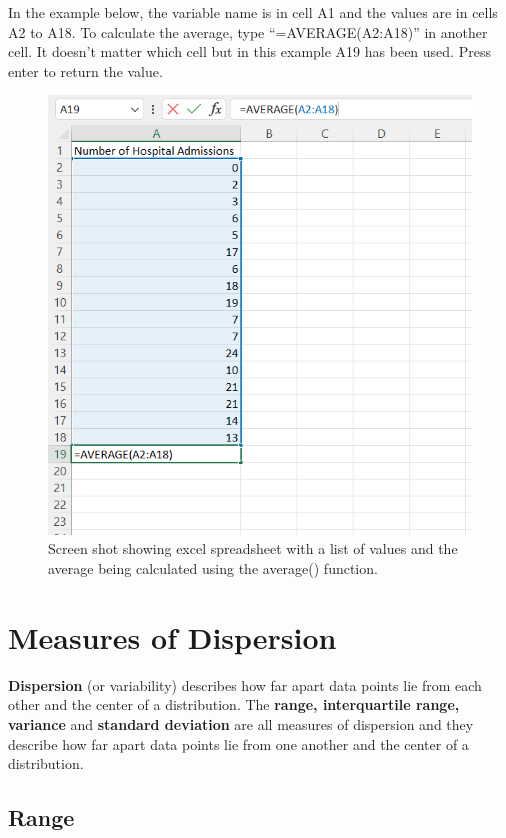 \documentclass[
]{book}
\begin{document}
In the example below, the variable name is in cell A1 and the values are in cells A2 to A18. To calculate the average, type ``=AVERAGE(A2:A18)'' in another cell. It doesn't matter which cell but in this example A19 has been used. Press enter to return the value.

\begin{figure}
\centering
\includegraphics{Excelimage.png}
\caption{Screen shot showing excel spreadsheet with a list of values and the average being calculated using the average() function.}
\end{figure}

\hypertarget{measures-of-dispersion}{%
\section{Measures of Dispersion}\label{measures-of-dispersion}}

\textbf{Dispersion} (or variability) describes how far apart data points lie from each other and the center of a distribution. The \textbf{range, interquartile range, variance} and \textbf{standard deviation} are all measures of dispersion and they describe how far apart data points lie from one another and the center of a distribution.

\hypertarget{range}{%
\subsection{Range}\label{range}}
\end{document}
